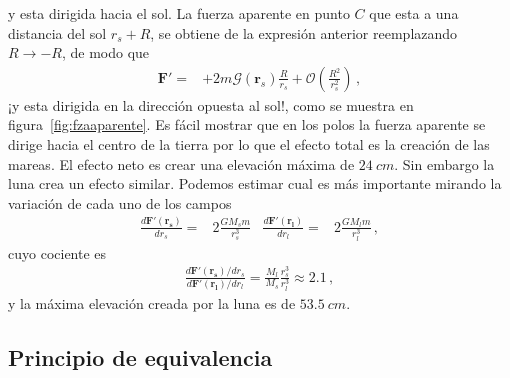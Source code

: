 y esta dirigida hacia el sol. La fuerza aparente en punto $C$ que esta a una distancia del sol $r_s+R$, se obtiene de la expresión anterior reemplazando $R\to -R$, de modo que
\begin{align*}
  \mathbf{F}'=&+2m\boldsymbol{\mathcal{G}}(\mathbf{r}_s)\frac{R}{r_s}+\mathcal{O}\left( \frac{R^2}{r_s^2} \right)\,,
\end{align*}
¡y esta dirigida en la dirección opuesta al sol!, como se muestra en figura~\ref{fig:fzaaparente}. Es fácil mostrar que en los polos la fuerza aparente se dirige hacia el centro de la tierra por lo que el efecto total es la creación de las mareas. El efecto neto es crear una elevación máxima de $\SI{24}{cm}$. Sin embargo la luna crea un efecto similar. Podemos estimar cual es más importante mirando la variación de cada uno de los campos
\begin{align*}
  \frac{d\mathbf{F}'(\mathbf{r_s})}{dr_s}=&2 \frac{GM_s m}{r_s^3}&  \frac{d\mathbf{F}'(\mathbf{r_l})}{dr_l}=&2 \frac{GM_l m}{r_l^3}\,,
\end{align*}
cuyo cociente es
\begin{align*}
  \frac{d\mathbf{F}'(\mathbf{r_s})/dr_s}{d\mathbf{F}'(\mathbf{r_l})/dr_l}=\frac{M_l}{M_s}\frac{r_s^3}{r_l^3}\approx 2.1\,,
\end{align*}
y la máxima elevación creada por la luna es de $\SI{53.5}{cm}$.


\subsection{Principio de equivalencia}



